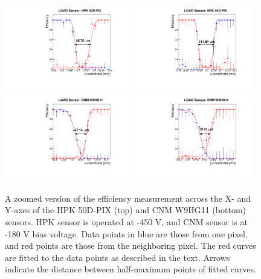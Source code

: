 \documentclass[preprint,1p]{elsarticle}
\begin{document}
\begin{figure}[htbp] 
\centering
\includegraphics[width=0.48\textwidth]{figs/UCSCBoard_HPK50CPix_CNM_W9HG11_Runs838-839-841/Eff_vs_X_Ch1_4_fit.pdf} 
\includegraphics[width=0.48\textwidth]{figs/UCSCBoard_HPK50CPix_CNM_W9HG11_Runs838-839-841/Eff_vs_Y_Ch3_4_fit.pdf} 
\includegraphics[width=0.48\textwidth]{figs/UCSCBoard_HPK50CPix_CNM_W9HG11_Runs838-839-841/Eff_vs_X_Ch10-13_fit.pdf} 
\includegraphics[width=0.48\textwidth]{figs/UCSCBoard_HPK50CPix_CNM_W9HG11_Runs838-839-841/Eff_vs_Y_Ch12-13_fit.pdf} 

\caption{A zoomed version of the efficiency measurement across the X- and Y-axes of the HPK 50D-PIX (top) and CNM W9HG11 (bottom) sensors. HPK sensor is operated at -450 V, and CNM sensor is at -180 V bias voltage. Data points in blue are those from one pixel, and red points are those from the neighboring pixel. The red curves are fitted to the data points as described in the text. Arrows indicate the distance between half-maximum points of fitted curves.} 
\label{fig:FNAL_HPK50_ZoomeffXY} 
\end{figure} 
\end{document}
